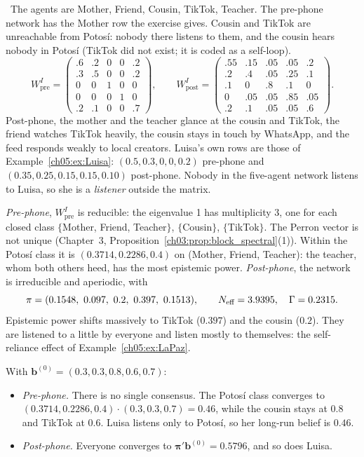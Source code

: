 \documentclass[../solutions_manual.tex]{subfiles}
\begin{document}
 \illustrative\ The agents are Mother, Friend, Cousin, TikTok, Teacher. The pre-phone network has the Mother row the exercise gives. Cousin and TikTok are unreachable from Potos\'i: nobody there listens to them, and the cousin hears nobody in Potos\'i (TikTok did not exist; it is coded as a self-loop).
\[
W^I_{\text{pre}} = \begin{pmatrix} .6 & .2 & 0 & 0 & .2\\ .3 & .5 & 0 & 0 & .2\\ 0 & 0 & 1 & 0 & 0\\ 0 & 0 & 0 & 1 & 0\\ .2 & .1 & 0 & 0 & .7\end{pmatrix},\qquad
W^I_{\text{post}} = \begin{pmatrix} .55 & .15 & .05 & .05 & .2\\ .2 & .4 & .05 & .25 & .1\\ .1 & 0 & .8 & .1 & 0\\ 0 & .05 & .05 & .85 & .05\\ .2 & .1 & .05 & .05 & .6\end{pmatrix}.
\]
Post-phone, the mother and the teacher glance at the cousin and TikTok, the friend watches TikTok heavily, the cousin stays in touch by WhatsApp, and the feed responds weakly to local creators. Luisa's own rows are those of Example~\ref{ch05:ex:Luisa}: $(0.5, 0.3, 0, 0, 0.2)$ pre-phone and $(0.35, 0.25, 0.15, 0.15, 0.10)$ post-phone. Nobody in the five-agent network listens to Luisa, so she is a \emph{listener} outside the matrix.

 \emph{Pre-phone}, $W^I_{\text{pre}}$ is reducible: the eigenvalue 1 has multiplicity 3, one for each closed class $\{$Mother, Friend, Teacher$\}$, $\{$Cousin$\}$, $\{$TikTok$\}$. The Perron vector is not unique (Chapter~3, Proposition~\ref{ch03:prop:block_spectral}(1)). Within the Potos\'i class it is $(0.3714, 0.2286, 0.4)$ on (Mother, Friend, Teacher): the teacher, whom both others heed, has the most epistemic power. \emph{Post-phone}, the network is irreducible and aperiodic, with
\[
\boldsymbol\pi = (0.1548,\ 0.097,\ 0.2,\ 0.397,\ 0.1513), \qquad \Neff = 3.9395,\quad \Gamma = 0.2315 .
\]
Epistemic power shifts massively to TikTok ($0.397$) and the cousin ($0.2$). They are listened to a little by everyone and listen mostly to themselves: the self-reliance effect of Example~\ref{ch05:ex:LaPaz}.

 With $\mathbf b^{(0)} = (0.3, 0.3, 0.8, 0.6, 0.7)$:
\begin{itemize}
\item \emph{Pre-phone.} There is no single consensus. The Potos\'i class converges to $(0.3714, 0.2286, 0.4)\cdot(0.3, 0.3, 0.7) = 0.46$, while the cousin stays at $0.8$ and TikTok at $0.6$. Luisa listens only to Potos\'i, so her long-run belief is $0.46$.
\item \emph{Post-phone.} Everyone converges to $\boldsymbol\pi'\mathbf b^{(0)} = 0.5796$, and so does Luisa.
\end{itemize}
\end{document}
